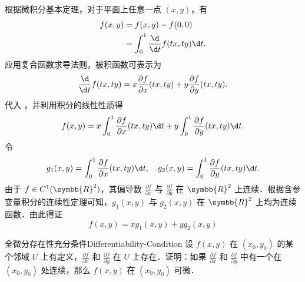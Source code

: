 \begin{myproof}
    根据微积分基本定理，对于平面上任意一点 $(x, y)$，有
    \begin{equation}
        \begin{aligned}
            f(x, y) & = f(x, y) - f(0, 0)                        \\
                    & = \int_0^1 \frac{\d}{\d t} f(tx, ty) \d t.
        \end{aligned} \label{eq:FTC-Expansion}
    \end{equation}
    应用复合函数求导法则，被积函数可表示为
    \begin{equation}
        \frac{\d}{\d t} f(tx, ty) = x \frac{\partial f}{\partial x}(tx, ty) + y \frac{\partial f}{\partial y}(tx, ty).
    \end{equation}
    代入 ，并利用积分的线性性质得
    \begin{equation}
        f(x, y) = x \int_0^1 \frac{\partial f}{\partial x}(tx, ty) \d t + y \int_0^1 \frac{\partial f}{\partial y}(tx, ty) \d t.
    \end{equation}
    令
    \begin{equation}
        g_1(x, y) = \int_0^1 \frac{\partial f}{\partial x}(tx, ty) \d t, \quad g_2(x, y) = \int_0^1 \frac{\partial f}{\partial y}(tx, ty) \d t.
    \end{equation}
    由于 $f \in C^1(\symbb{R}^2)$，其偏导数 $\frac{\partial f}{\partial x}$ 与 $\frac{\partial f}{\partial y}$ 在 $\symbb{R}^2$ 上连续．根据含参变量积分的连续性定理可知，$g_1(x, y)$ 与 $g_2(x, y)$ 在 $\symbb{R}^2$ 上均为连续函数．由此得证
    \begin{equation}
        \boxed{f(x, y) = x g_1(x, y) + y g_2(x, y)}
    \end{equation}
\end{myproof}


\begin{problem}{全微分存在性充分条件}{Differentiability-Condition}
    设 $f(x, y)$ 在 $(x_0, y_0)$ 的某个邻域 $U$ 上有定义，$\frac{\partial f}{\partial x}$ 和 $\frac{\partial f}{\partial y}$ 在 $U$ 上存在．证明：如果 $\frac{\partial f}{\partial x}$ 和 $\frac{\partial f}{\partial y}$ 中有一个在 $(x_0, y_0)$ 处连续，那么 $f(x, y)$ 在 $(x_0, y_0)$ 可微．
\end{problem}

